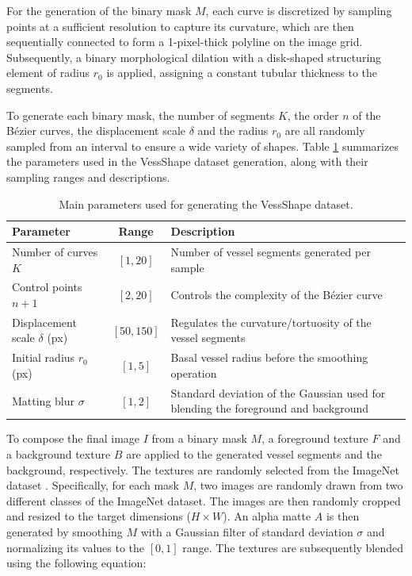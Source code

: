 \documentclass[%
reprint,
nofootinbib,
 amsmath,amssymb,
aps,
superscriptaddress,
showkeys,
longbibliography
]{revtex4-1}
\begin{document}
For the generation of the binary mask $M$, each curve is discretized by sampling points at a sufficient resolution to capture its curvature, which are then sequentially connected to form a 1-pixel-thick polyline on the image grid. Subsequently, a binary morphological dilation with a disk-shaped structuring element of radius $r_0$ is applied, assigning a constant tubular thickness to the segments. 

To generate each binary mask, the number of segments $K$, the order $n$ of the Bézier curves, the displacement scale $\delta$ and the radius $r_0$ are all randomly sampled from an interval to ensure a wide variety of shapes. Table \ref{tab:vessshape_params} summarizes the parameters used in the VessShape dataset generation, along with their sampling ranges and descriptions.

\begin{table}[t]
\caption{Main parameters used for generating the VessShape dataset.}
\label{tab:vessshape_params}
\centering
\begin{tabularx}{\textwidth}{l c X}
\hline
    \textbf{Parameter} & \textbf{Range} & \textbf{Description} \\
\hline
Number of curves $K$ & $[1,20]$ & Number of vessel segments generated per sample \\
Control points $n{+}1$ & $[2,20]$ & Controls the complexity of the Bézier curve \\
Displacement scale $\delta$ (px) & $[50,150]$ & Regulates the curvature/tortuosity of the vessel segments \\
Initial radius $r_{0}$ (px) & $[1,5]$ & Basal vessel radius before the smoothing operation \\
Matting blur $\sigma$ & $[1,2]$ & Standard deviation of the Gaussian used for blending the foreground and background \\

\hline
\end{tabularx}
\end{table}

To compose the final image $I$ from a binary mask $M$, a foreground texture $F$ and a background texture $B$ are applied to the generated vessel segments and the background, respectively. The textures are randomly selected from the ImageNet dataset \cite{JiaDeng2009}. Specifically, for each mask $M$, two images are randomly drawn from two different classes of the ImageNet dataset. The images are then randomly cropped and resized to the target dimensions ($H \times W$). An alpha matte $A$ is then generated by smoothing $M$ with a Gaussian filter of standard deviation $\sigma$ and normalizing its values to the $[0, 1]$ range. The textures are subsequently blended using the following equation:
\end{document}
